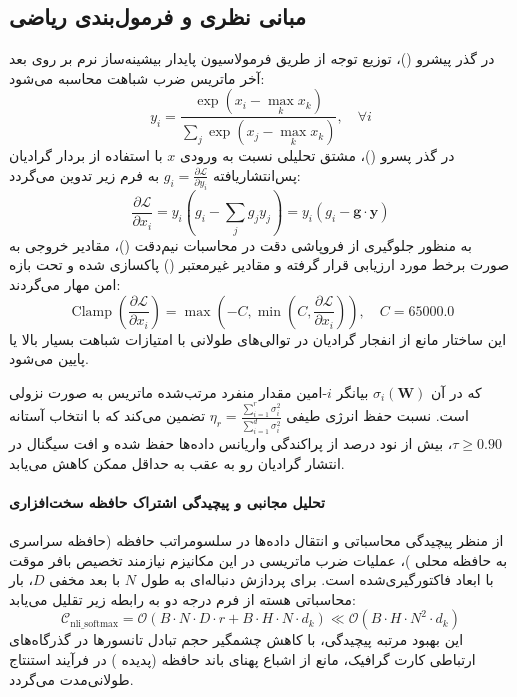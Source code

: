 \subsection{مبانی نظری و فرمول‌بندی ریاضی}
در گذر پیشرو ()، توزیع توجه از طریق فرمولاسیون پایدار بیشینه‌ساز نرم بر روی بعد آخر ماتریس ضرب شباهت محاسبه می‌شود:
\begin{equation}
y_i = \frac{\exp(x_i - \max_k x_k)}{\sum_j \exp(x_j - \max_k x_k)}, \quad \forall i
\end{equation}
در گذر پسرو ()، مشتق تحلیلی نسبت به ورودی $x$ با استفاده از بردار گرادیان پس‌انتشاریافته $g_i = \frac{\partial \mathcal{L}}{\partial y_i}$ به فرم زیر تدوین می‌گردد:
\begin{equation}
\frac{\partial \mathcal{L}}{\partial x_i} = y_i \left( g_i - \sum_j g_j y_j \right) = y_i (g_i - \mathbf{g} \cdot \mathbf{y})
\end{equation}
به منظور جلوگیری از فروپاشی دقت در محاسبات نیم‌دقت ()، مقادیر خروجی به صورت برخط مورد ارزیابی قرار گرفته و مقادیر غیرمعتبر () پاکسازی شده و تحت بازه امن مهار می‌گردند:
\begin{equation}
\operatorname{Clamp}\left(\frac{\partial \mathcal{L}}{\partial x_i}\right) = \max\left(-C, \min\left(C, \frac{\partial \mathcal{L}}{\partial x_i}\right)\right), \quad C = 65000.0
\end{equation}
این ساختار مانع از انفجار گرادیان در توالی‌های طولانی با امتیازات شباهت بسیار بالا یا پایین می‌شود.

که در آن $\sigma_i(\mathbf{W})$ بیانگر $i$-امین مقدار منفرد مرتب‌شده ماتریس به صورت نزولی است. نسبت حفظ انرژی طیفی $\eta_r = \frac{\sum_{i=1}^r \sigma_i^2}{\sum_{i=1}^{d} \sigma_i^2}$ تضمین می‌کند که با انتخاب آستانه $\tau \ge 0.90$، بیش از نود درصد از پراکندگی واریانس داده‌ها حفظ شده و افت سیگنال در انتشار گرادیان رو به عقب به حداقل ممکن کاهش می‌یابد.

\paragraph{تحلیل مجانبی و پیچیدگی اشتراک حافظه سخت‌افزاری}
از منظر پیچیدگی محاسباتی و انتقال داده‌ها در سلسومراتب حافظه (حافظه سراسری  به حافظه محلی )، عملیات ضرب ماتریسی در این مکانیزم نیازمند تخصیص بافر موقت با ابعاد فاکتورگیری‌شده است. برای پردازش دنباله‌ای به طول $N$ با بعد مخفی $D$، بار محاسباتی هسته از فرم درجه دو به رابطه زیر تقلیل می‌یابد:
\begin{equation}
\label{eq:complexity_nli_softmax}
\mathcal{C}_{\text{nli\_softmax}} = \mathcal{O}\left( B \cdot N \cdot D \cdot r + B \cdot H \cdot N \cdot d_k \right) \ll \mathcal{O}\left( B \cdot H \cdot N^2 \cdot d_k \right)
\end{equation}
این بهبود مرتبه پیچیدگی، با کاهش چشمگیر حجم تبادل تانسورها در گذرگاه‌های ارتباطی کارت گرافیک، مانع از اشباع پهنای باند حافظه (پدیده ) در فرآیند استنتاج طولانی‌مدت می‌گردد.
